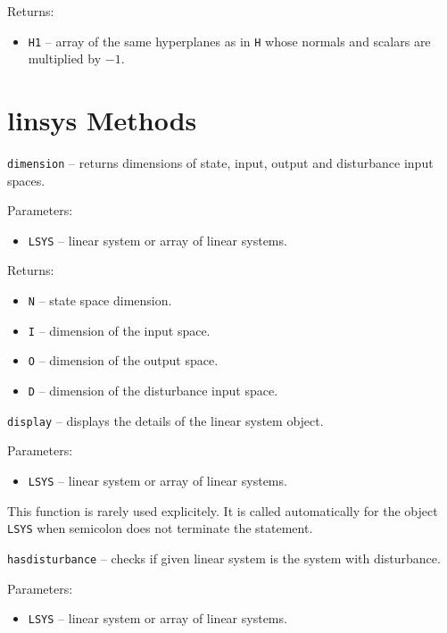 Returns:
\begin{itemize}
\item {\tt H1} -- array of the same hyperplanes as in {\tt H} whose normals and
scalars are multiplied by $-1$.
\end{itemize}



\newpage

\section{linsys Methods}
{\Large {\tt dimension}} -- returns dimensions of state, input, output and
disturbance input spaces.

Parameters:
\begin{itemize}
\item {\tt LSYS} -- linear system or array of linear systems.
\end{itemize}

Returns:
\begin{itemize}
\item {\tt N} -- state space dimension.
\item {\tt I} -- dimension of the input space.
\item {\tt O} -- dimension of the output space.
\item {\tt D} -- dimension of the disturbance input space.
\end{itemize}

\newpage

{\Large {\tt display}} -- displays the details of the linear system object.

Parameters:
\begin{itemize}
\item {\tt LSYS} -- linear system or array of linear systems.
\end{itemize}
This function is rarely used explicitely. It is called automatically
for the object {\tt LSYS} when semicolon does not terminate the statement.

\newpage

{\Large {\tt hasdisturbance}} -- checks if given linear system is the system
with disturbance.

Parameters:
\begin{itemize}
\item {\tt LSYS} -- linear system or array of linear systems.
\end{itemize}

